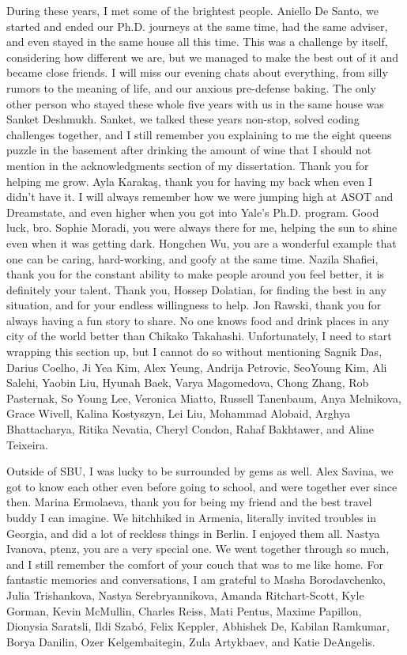 {During these years, I met some of the brightest people.
Aniello De Santo, we started and ended our Ph.D. journeys at the same time, had the same adviser, and even stayed in the same house all this time.
This was a challenge by itself, considering how different we are, but we managed to make the best out of it and became close friends.
I will miss our evening chats about everything, from silly rumors to the meaning of life, and our anxious pre-defense baking.
The only other person who stayed these whole five years with us in the same house was Sanket Deshmukh.
Sanket, we talked these years non-stop, solved coding challenges together, and I still remember you explaining to me the eight queens puzzle in the basement after drinking the amount of wine that I should not mention in the acknowledgments section of my dissertation.
Thank you for helping me grow.
Ayla Karaka\c{s}, thank you for having my back when even I didn't have it.
I will always remember how we were jumping high at ASOT and Dreamstate, and even higher when you got into Yale's Ph.D. program.
Good luck, bro.
Sophie Moradi, you were always there for me, helping the sun to shine even when it was getting dark.
Hongchen Wu, you are a wonderful example that one can be caring, hard-working, and goofy at the same time.
Nazila Shafiei, thank you for the constant ability to make people around you feel better, it is definitely your talent.
Thank you, Hossep Dolatian, for finding the best in any situation, and for your endless willingness to help.
Jon Rawski, thank you for always having a fun story to share.
No one knows food and drink places in any city of the world better than Chikako Takahashi.
Unfortunately, I need to start wrapping this section up, but I cannot do so without mentioning Sagnik Das, Darius Coelho, Ji Yea Kim, Alex Yeung, Andrija Petrovic, SeoYoung Kim, Ali Salehi, Yaobin Liu, Hyunah Baek, Varya Magomedova, Chong Zhang, Rob Pasternak, So Young Lee, Veronica Miatto, Russell Tanenbaum, Anya Melnikova, Grace Wivell, Kalina Kostyszyn, Lei Liu, Mohammad Alobaid, Arghya Bhattacharya, Ritika Nevatia, Cheryl Condon, Rahaf Bakhtawer, and Aline Teixeira.

Outside of SBU, I was lucky to be surrounded by gems as well.
Alex Savina, we got to know each other even before going to school, and were together ever since then.
Marina Ermolaeva, thank you for being my friend and the best travel buddy I can imagine.
We hitchhiked in Armenia, literally invited troubles in Georgia, and did a lot of reckless things in Berlin.
I enjoyed them all.
Nastya Ivanova, ptenz, you are a very special one.
We went together through so much, and I still remember the comfort of your couch that was to me like home.
For fantastic memories and conversations, I am grateful to Masha Borodavchenko, Julia Trishankova, Nastya Serebryannikova, Amanda Ritchart-Scott, Kyle Gorman, Kevin McMullin, Charles Reiss, Mati Pentus, Maxime Papillon, Dionysia Saratsli, Ildi Szab\'o, Felix Keppler, Abhishek De, Kabilan Ramkumar, Borya Danilin, Ozer Kelgembaitegin, Zula Artykbaev, and Katie DeAngelis.

}
